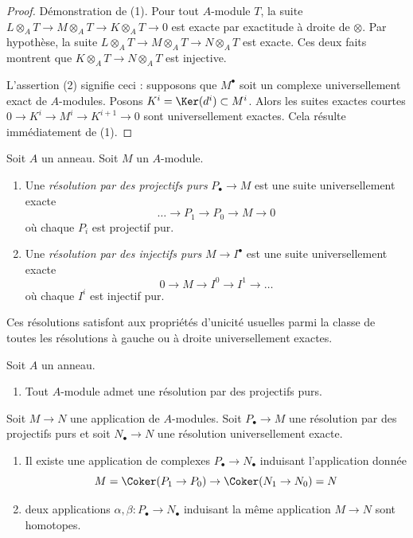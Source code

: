 \begin{proof}
Démonstration de (1). Pour tout $A$-module $T$, la suite
$L \otimes_A T \to M \otimes_A T \to K \otimes_A T \to 0$ est exacte
par exactitude à droite de $\otimes$. Par hypothèse, la suite
$L \otimes_A T \to M \otimes_A T \to N \otimes_A T$ est exacte.
Ces deux faits montrent que $K \otimes_A T \to N \otimes_A T$ est injective.

\medskip\noindent
L'assertion (2) signifie ceci : supposons que $M^\bullet$ soit un complexe
universellement exact de $A$-modules. Posons $K^i = \Ker(d^i) \subset M^i$.
Alors les suites exactes courtes $0 \to K^i \to M^i \to K^{i + 1} \to 0$
sont universellement exactes. Cela résulte immédiatement de (1).
\end{proof}

\begin{definition}
\label{definition-pure-resolution}
Soit $A$ un anneau. Soit $M$ un $A$-module.
\begin{enumerate}
\item Une {\it résolution par des projectifs purs} $P_\bullet \to M$
est une suite universellement exacte
$$
\ldots \to P_1 \to P_0 \to M \to 0
$$
où chaque $P_i$ est projectif pur.
\item Une {\it résolution par des injectifs purs} $M \to I^\bullet$ est une suite
universellement exacte
$$
0 \to M \to I^0 \to I^1 \to \ldots
$$
où chaque $I^i$ est injectif pur.
\end{enumerate}
\end{definition}

\noindent
Ces résolutions satisfont aux propriétés d'unicité usuelles parmi la classe
de toutes les résolutions à gauche ou à droite universellement exactes.

\begin{lemma}
\label{lemma-pure-projective-resolutions}
Soit $A$ un anneau.
\begin{enumerate}
\item Tout $A$-module admet une résolution par des projectifs purs.
\end{enumerate}
Soit $M \to N$ une application de $A$-modules.
Soit $P_\bullet \to M$ une résolution par des projectifs purs et
soit $N_\bullet \to N$ une résolution universellement exacte.
\begin{enumerate}
\item[(2)] Il existe une application de complexes $P_\bullet \to N_\bullet$
induisant l'application donnée
$$
M = \Coker(P_1 \to P_0) \to \Coker(N_1 \to N_0) = N
$$
\item[(3)] deux applications $\alpha, \beta : P_\bullet \to N_\bullet$
induisant la même application $M \to N$ sont homotopes.
\end{enumerate}
\end{lemma}


